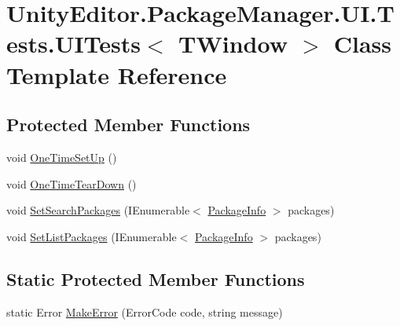 \hypertarget{class_unity_editor_1_1_package_manager_1_1_u_i_1_1_tests_1_1_u_i_tests}{}\section{Unity\+Editor.\+Package\+Manager.\+U\+I.\+Tests.\+U\+I\+Tests$<$ T\+Window $>$ Class Template Reference}
\label{class_unity_editor_1_1_package_manager_1_1_u_i_1_1_tests_1_1_u_i_tests}
\subsection*{Protected Member Functions}
\begin{DoxyCompactItemize}
\item 
void \mbox{\hyperlink{class_unity_editor_1_1_package_manager_1_1_u_i_1_1_tests_1_1_u_i_tests_a7613451e1b956b907406b412f66cffac}{One\+Time\+Set\+Up}} ()
\item 
void \mbox{\hyperlink{class_unity_editor_1_1_package_manager_1_1_u_i_1_1_tests_1_1_u_i_tests_af76787bd1a09eeac55191bd9df41e282}{One\+Time\+Tear\+Down}} ()
\item 
void \mbox{\hyperlink{class_unity_editor_1_1_package_manager_1_1_u_i_1_1_tests_1_1_u_i_tests_a273a4933fc6cb214a847491c20e37a6c}{Set\+Search\+Packages}} (I\+Enumerable$<$ \mbox{\hyperlink{class_unity_editor_1_1_package_manager_1_1_u_i_1_1_package_info}{Package\+Info}} $>$ packages)
\item 
void \mbox{\hyperlink{class_unity_editor_1_1_package_manager_1_1_u_i_1_1_tests_1_1_u_i_tests_abd2ad07e23f3aab12e2514f2121cd80e}{Set\+List\+Packages}} (I\+Enumerable$<$ \mbox{\hyperlink{class_unity_editor_1_1_package_manager_1_1_u_i_1_1_package_info}{Package\+Info}} $>$ packages)
\end{DoxyCompactItemize}
\subsection*{Static Protected Member Functions}
\begin{DoxyCompactItemize}
\item 
static Error \mbox{\hyperlink{class_unity_editor_1_1_package_manager_1_1_u_i_1_1_tests_1_1_u_i_tests_a87def7aa22c1e0676f7621df8b18594e}{Make\+Error}} (Error\+Code code, string message)
\end{DoxyCompactItemize}
